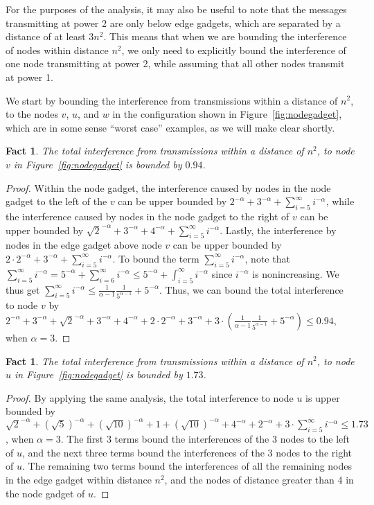 \documentclass{article}
\newtheorem{fact}[lemma]{Fact}
\begin{document}
For the purposes of the analysis, it may also be useful to note that the messages transmitting at power 2 are only below edge gadgets, which are separated by a distance of at least $3 n^2$.  This means that when we are bounding the interference of nodes within distance $n^2$, we only need to explicitly bound the interference of one node transmitting at power 2, while assuming that all other nodes transmit at power 1.

We start by bounding the interference from transmissions within a distance of $n^2$, to the nodes $v$, $u$, and $w$ in the configuration shown in Figure~\ref{fig:nodegadget}, which are in some sense ``worst case'' examples, as we will make clear shortly.

\begin{fact}\label{fact:v}
The total interference from transmissions within a distance of $n^2$, to node $v$ in Figure~\ref{fig:nodegadget} is bounded by $0.94$.
\end{fact}
\begin{proof}
Within the node gadget, the interference caused by nodes in the node gadget to the left of the $v$ can be upper bounded by $2^{-\alpha} + 3^{-\alpha} + \sum_{i=5}^{\infty} i^{-\alpha}$, while the interference caused by nodes in the node gadget to the right of $v$ can be upper bounded by $\sqrt{2}^{-\alpha} + 3^{-\alpha} + 4^{-\alpha} + \sum_{i=5}^{\infty} i^{-\alpha}$.  Lastly, the interference by nodes in the edge gadget above node $v$ can be upper bounded by $2 \cdot 2^{-\alpha} + 3^{-\alpha} + \sum_{i=5}^{\infty} i^{-\alpha}$.  To bound the term $\sum_{i=5}^{\infty} i^{-\alpha}$, note that $\sum_{i=5}^{\infty} i^{-\alpha} = 5^{-\alpha} + \sum_{i=6}^{\infty} i^{-\alpha} \leq 5^{-\alpha} + \int_{i=5}^{\infty} i^{-\alpha}$ since $i^{-\alpha}$ is nonincreasing. We thus get $\sum_{i=5}^{\infty} i^{-\alpha} \leq \frac{1}{\alpha-1} \frac{1}{5^{\alpha-1}} + 5^{-\alpha}$.  Thus, we can bound the total interference to node $v$ by $2^{-\alpha} + 3^{-\alpha} + \sqrt{2}^{-\alpha} + 3^{-\alpha} + 4^{-\alpha} + 2 \cdot 2^{-\alpha} + 3^{-\alpha} + 3\cdot(\frac{1}{\alpha-1} \frac{1}{5^{\alpha-1}} + 5^{-\alpha}) \leq 0.94$, when $\alpha = 3$.
\end{proof}

\begin{fact}\label{fact:boundary}
The total interference from transmissions within a distance of $n^2$, to node $u$ in Figure~\ref{fig:nodegadget} is bounded by $1.73$.
\end{fact}
\begin{proof}
By applying the same analysis, the total interference to node $u$ is upper bounded by $\sqrt{2}^{-\alpha} + (\sqrt{5})^{-\alpha} + (\sqrt{10})^{-\alpha} + 1 + (\sqrt{10})^{-\alpha} + 4^{-\alpha} + 2^{-\alpha} + 3 \cdot \sum_{i=5}^{\infty} i^{-\alpha} \leq 1.73$, when $\alpha = 3$.  The first 3 terms bound the interferences of the 3 nodes to the left of $u$, and the next three terms bound the interferences of the 3 nodes to the right of $u$.  The remaining two terms bound the interferences of all the remaining nodes in the edge gadget within distance $n^2$, and the nodes of distance greater than 4 in the node gadget of $u$.
\end{proof}
\end{document}
